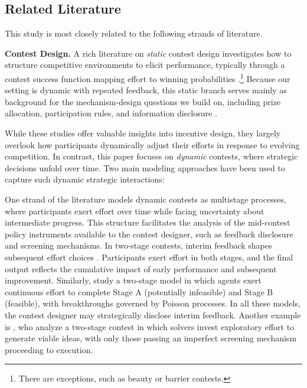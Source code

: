 \documentclass[mnsc]{informs3}
\begin{document}
\subsection{Related Literature}

This study is most closely related to the following strands of literature.

\textbf{Contest Design.}
A rich literature on \textit{static} contest design \citep{ales2017optimal_award} investigates how to structure competitive environments to elicit performance, typically through a contest success function mapping effort to winning probabilities \citep{skaperdas1996contest}.\footnote{There are exceptions, such as beauty or barrier contests.}
Because our setting is dynamic with repeated feedback, this static branch serves mainly as background for the mechanism-design questions we build on, including prize allocation, participation rules, and information disclosure \citep{moldovanu2001optimal, ales2021number_of_players, bergemann2022optimal}.


While these studies offer valuable insights into incentive design, they largely overlook how participants dynamically adjust their efforts in response to evolving competition.
In contrast, this paper focuses on \textit{dynamic} contests, where strategic decisions unfold over time.
Two main modeling approaches have been used to capture such dynamic strategic interactions:

One strand of the literature models dynamic contests as multistage processes, where participants exert effort over time while facing uncertainty about intermediate progress.
This structure facilitates the analysis of the mid-contest policy instruments available to the contest designer, such as feedback disclosure and screening mechanisms.
In two-stage contests, interim feedback shapes subsequent effort choices \citep{aoyagi2010information, mihm2019feedback}.
Participants exert effort in both stages, and the final output reflects the cumulative impact of early performance and subsequent improvement.
Similarly, \citet{bimpikis2019designing} study a two-stage model in which agents exert continuous effort to complete Stage A (potentially infeasible) and Stage B (feasible), with breakthroughs governed by Poisson processes.
In all these models, the contest designer may strategically disclose interim feedback.
Another example is \citet{Khorasani2023screening}, who analyze a two-stage contest in which solvers invest exploratory effort to generate viable ideas, with only those passing an imperfect screening mechanism proceeding to execution.
\end{document}
